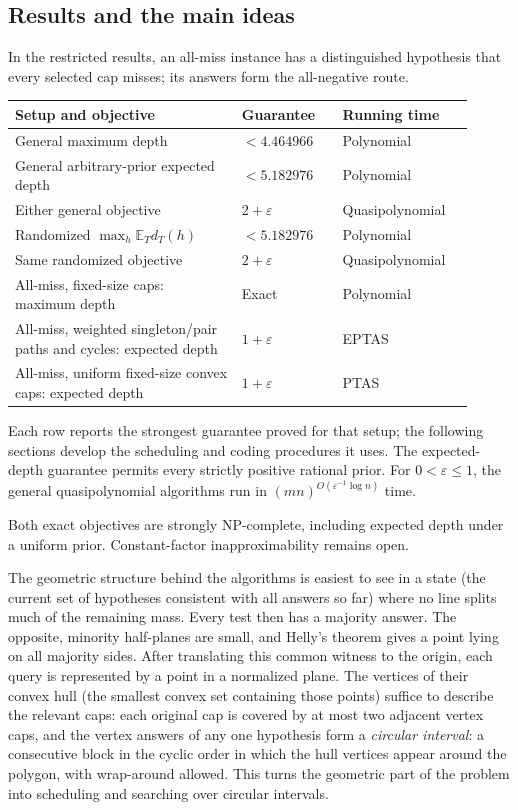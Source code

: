 \subsection{Results and the main ideas}

In the restricted results, an all-miss instance has a distinguished
hypothesis that every selected cap misses; its answers form the
all-negative route.

\begin{center}
\small
\begin{tabular}{@{}p{0.45\linewidth}p{0.20\linewidth}p{0.26\linewidth}@{}}
\hline
Setup and objective & Guarantee & Running time\\ \hline
General maximum depth & $<4.464966$ & Polynomial\\
General arbitrary-prior expected depth & $<5.182976$ & Polynomial\\
Either general objective & $2+\varepsilon$ & Quasipolynomial\\
Randomized $\max_h\mathbb E_Td_T(h)$ & $<5.182976$ & Polynomial\\
Same randomized objective & $2+\varepsilon$ & Quasipolynomial\\
All-miss, fixed-size caps: maximum depth & Exact & Polynomial\\
All-miss, weighted singleton/pair paths and cycles: expected depth
 & $1+\varepsilon$ & EPTAS\\
All-miss, uniform fixed-size convex caps: expected depth
 & $1+\varepsilon$ & PTAS\\ \hline
\end{tabular}
\end{center}

Each row reports the strongest guarantee proved for that setup; the
following sections develop the scheduling and coding procedures it
uses.
The expected-depth guarantee permits every strictly positive rational
prior. For $0<\varepsilon\le1$, the general
quasipolynomial algorithms run in
$(mn)^{O(\varepsilon^{-1}\log n)}$ time.

Both exact objectives are strongly NP-complete, including expected
depth under a uniform prior. Constant-factor inapproximability remains
open.

The geometric structure behind the algorithms is easiest to see in a
state (the current set of hypotheses consistent with all answers so
far) where no line splits much of the remaining mass. Every test
then has a majority answer. The opposite, minority half-planes are
small, and Helly's theorem gives a point lying on all majority sides.
After translating this common witness to the origin, each query is
represented by a point in a normalized plane. The vertices of their
convex hull (the smallest convex set containing those points) suffice
to describe the relevant caps: each original cap is covered by at
most two adjacent vertex caps, and the vertex
answers of any one hypothesis form a \emph{circular interval}: a
consecutive block in the cyclic order in which the hull vertices
appear around the polygon, with wrap-around allowed. This turns the
geometric part of the problem into scheduling and searching over
circular intervals.

